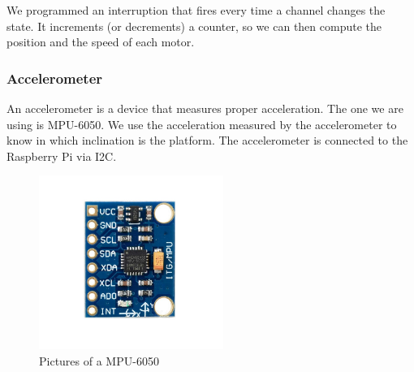 We programmed an interruption that fires every time a channel changes the state.
It increments (or decrements) a counter, so we can then compute the position and
the speed of each motor.

\subsubsection{Accelerometer}
An accelerometer is a device that measures proper acceleration. The one we are using is MPU-6050.
We use the acceleration measured by the accelerometer to know in which inclination
is the platform. The accelerometer is connected to the Raspberry Pi via I2C.

\begin{figure}[H]
    \centering
    \includegraphics[width=6cm]{img/components/mpu-6050.jpg}
    \caption{Pictures of a MPU-6050}
    \label{fig: MPU-6050}
\end{figure}